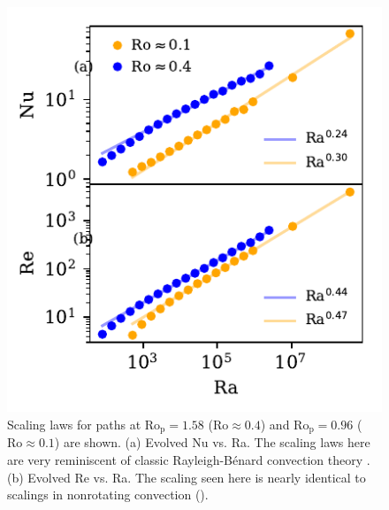 \documentclass[twocolumn, amsmath, amsfonts, amssymb, trackchanges]{aastex62}
\newcommand{\RB}{Rayleigh-B\'{e}nard }
\newcommand{\pro}{\ensuremath{\text{Ro}_{\text{p}}}}
\begin{document}
\begin{figure}[t!]
    \includegraphics{nu_and_re.pdf}
    \caption{Scaling laws for paths at $\pro = 1.58$ ($\text{Ro} \approx 0.4$) and
    $\pro = 0.96$ ($\text{Ro} \approx 0.1$) are shown. 
    (a) Evolved Nu vs. Ra. The scaling laws here are very reminiscent of classic \RB convection
    theory \citep{ahlers&all2009}.
    (b) Evolved Re vs. Ra.
    The scaling seen here is nearly identical to scalings in nonrotating convection (\AB).
    \label{fig:nu_and_re} }
\end{figure}
\end{document}
